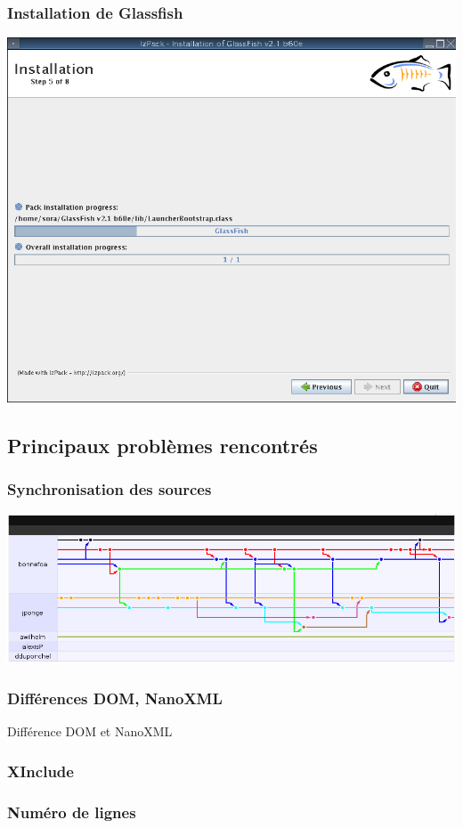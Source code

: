 \begin{frame}\frametitle{Installation de Glassfish}
	\centering
	\includegraphics[width=\linewidth]{../image/installationGlassfish.png}
\end{frame}
\subsection{Principaux problèmes rencontrés}
\begin{frame}\frametitle{Synchronisation des sources}
\includegraphics[width=\linewidth]{../image/gitHubBranche.png}
\end{frame}
\begin{frame}\frametitle{Différences DOM, NanoXML}
Différence DOM et NanoXML
\end{frame}
\begin{frame}\frametitle{XInclude}
\end{frame}
\begin{frame}\frametitle{Numéro de lignes}
\end{frame}